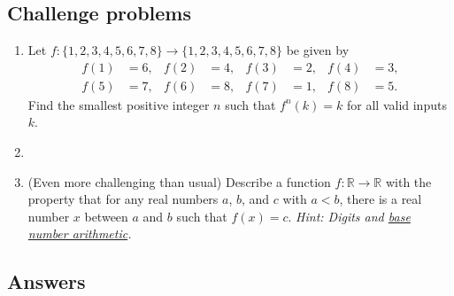 \subsection{Challenge problems}

\begin{enumerate}[resume]
\item Let $f:\{1,2,3,4,5,6,7,8\}\to\{1,2,3,4,5,6,7,8\}$ be given by
\begin{align*}
f(1) &= 6, & f(2) &= 4, & f(3) &= 2, & f(4) &= 3, \\
f(5) &= 7, & f(6) &= 8, & f(7) &= 1, & f(8) &= 5.
\end{align*}
Find the smallest positive integer $n$ such that $f^n(k) = k$ for all valid inputs $k$.
\item 
\item (Even more challenging than usual) Describe a function $f:\mathbb{R}\to\mathbb{R}$ with the property that for any real numbers $a$, $b$, and $c$ with $a < b$, there is a real number $x$ between $a$ and $b$ such that $f(x) = c$. \emph{Hint: Digits and \href{https://en.wikipedia.org/wiki/Positional_notation}{base number arithmetic}.}
\end{enumerate}


\newpage
\subsection{Answers}